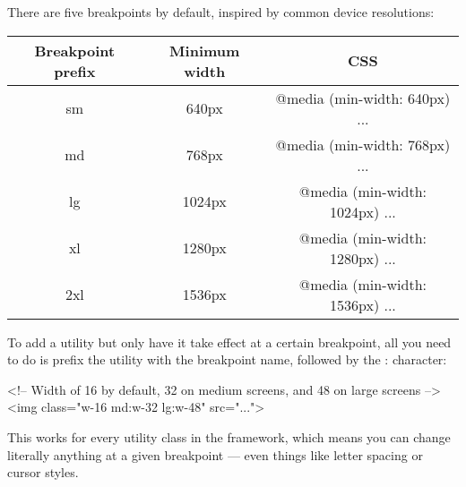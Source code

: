 \documentclass{report}
\begin{document}
    \pagebreak 
    \bigbreak \noindent 
    There are five breakpoints by default, inspired by common device resolutions:
    \bigbreak \noindent 
    \begin{center}
        \begin{tabular}{c|c|c}
            Breakpoint prefix	&Minimum width	&CSS \\
            \hline
            sm	&640px	&@media (min-width: 640px) { ... } \\
            md	&768px	&@media (min-width: 768px) { ... } \\
            lg	&1024px	&@media (min-width: 1024px) { ... }\\
            xl	&1280px	&@media (min-width: 1280px) { ... }\\
            2xl	&1536px	&@media (min-width: 1536px) { ... }
        \end{tabular}
    \end{center}
    \bigbreak \noindent 
    To add a utility but only have it take effect at a certain breakpoint, all you need to do is prefix the utility with the breakpoint name, followed by the : character:
    \bigbreak \noindent 
    \begin{htmlcode}
        <!-- Width of 16 by default, 32 on medium screens, and 48 on large screens -->
        <img class="w-16 md:w-32 lg:w-48" src="...">
    \end{htmlcode}
    \bigbreak \noindent 
    This works for every utility class in the framework, which means you can change literally anything at a given breakpoint — even things like letter spacing or cursor styles.
    \bigbreak \noindent 
\end{document}
